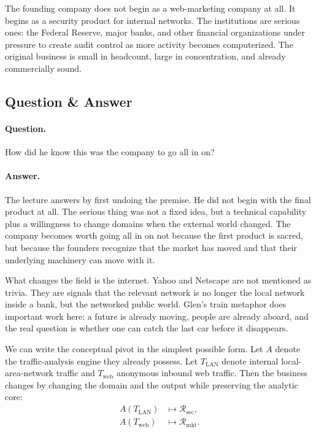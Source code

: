 The founding company does not begin as a web-marketing company at all. It begins as a security product for internal networks. The institutions are serious ones: the Federal Reserve, major banks, and other financial organizations under pressure to create audit control as more activity becomes computerized. The original business is small in headcount, large in concentration, and already commercially sound.

\subsection{Question \& Answer}

\paragraph{Question.} How did he know this was the company to go all in on?

\paragraph{Answer.} The lecture answers by first undoing the premise. He did not begin with the final product at all. The serious thing was not a fixed idea, but a technical capability plus a willingness to change domains when the external world changed. The company becomes worth going all in on not because the first product is sacred, but because the founders recognize that the market has moved and that their underlying machinery can move with it.

What changes the field is the internet. Yahoo and Netscape are not mentioned as trivia. They are signals that the relevant network is no longer the local network inside a bank, but the networked public world. Glen's train metaphor does important work here: a future is already moving, people are already aboard, and the real question is whether one can catch the last car before it disappears.

We can write the conceptual pivot in the simplest possible form. Let \(A\) denote the traffic-analysis engine they already possess. Let \(T_{\mathrm{LAN}}\) denote internal local-area-network traffic and \(T_{\mathrm{web}}\) anonymous inbound web traffic. Then the business changes by changing the domain and the output while preserving the analytic core:
\begin{align}
A(T_{\mathrm{LAN}}) &\mapsto \mathcal{R}_{\mathrm{sec}},\\
A(T_{\mathrm{web}}) &\mapsto \mathcal{R}_{\mathrm{mkt}}.
\end{align}

